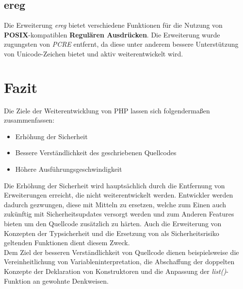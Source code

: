     \subsection{ereg}\label{ereg}
    Die Erweiterung \textit{ereg} bietet verschiedene Funktionen für die Nutzung von \textbf{POSIX}-kompatiblen \textbf{Regulären Ausdrücken}. Die Erweiterung wurde
    zugungsten von \textit{\acs{PCRE}} entfernt, da diese unter anderem bessere Unterstützung von Unicode-Zeichen bietet und aktiv weiterentwickelt wird. \cite{popov_php:_2014}

\section{Fazit}
Die Ziele der Weiterentwicklung von \acs{PHP} lassen sich folgendermaßen zusammenfassen:
\begin{itemize}
    \item Erhöhung der Sicherheit
    \item Bessere Verständlichkeit des geschriebenen Quellcodes
    \item Höhere Ausführungsgeschwindigkeit
\end{itemize}  
Die Erhöhung der Sicherheit wird hauptsächlich durch die Entfernung von Erweiterungen erreicht, die nicht weiterentwickelt werden. Entwickler werden dadurch gezwungen,
diese mit Mitteln zu ersetzen, welche zum Einen auch zukünftig mit Sicherheitsupdates versorgt werden und zum Anderen Features bieten um den Quellcode zusätzlich
zu härten. Auch die Erweiterung von Konzepten der Typsicherheit und die Ersetzung von als Sicherheitsrisiko geltenden Funktionen dient diesem Zweck.\\
Dem Ziel der besseren Verständlichkeit von Quellcode dienen beispielsweise die Vereinheitlichung von Variableninterpretation, die Abschaffung der doppelten Konzepte
der Deklaration von Konstruktoren und die Anpassung der \textit{list()}-Funktion an gewohnte Denkweisen.\\